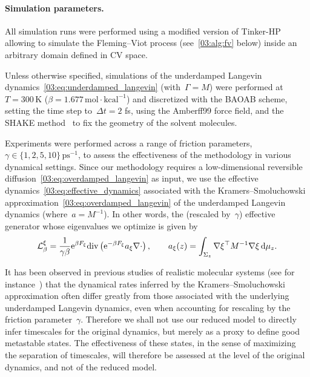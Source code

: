 \paragraph{Simulation parameters.}
All simulation runs were performed using a modified version of Tinker-HP~\cite{Tinker18} allowing to simulate the Fleming--Viot process (see~\ref{03:alg:fv} below) inside an arbitrary domain defined in CV space.

Unless otherwise specified, simulations of the underdamped Langevin dynamics~\eqref{03:eq:underdamped_langevin} (with~$\Gamma=M$) were performed at~$T=300\,\mathrm{K}$ ($\beta=1.677\,\mathrm{mol}\cdot\mathrm{kcal}^{-1}$) and discretized with the BAOAB scheme, setting the time step to~$\Delta t = 2$ fs, using the Amberff99 force field, and the SHAKE method~\cite{RCB77} to fix the geometry of the solvent molecules.

Experiments were performed across a range of friction parameters,~$\gamma\in\{1,2,5,10\}\,\mathrm{ps}^{-1}$, to assess the effectiveness of the methodology in various dynamical settings.
Since our methodology requires a low-dimensional reversible diffusion~\eqref{03:eq:overdamped_langevin} as input, we use the effective dynamics~\eqref{03:eq:effective_dynamics} associated with the Kramers--Smoluchowski approximation~\eqref{03:eq:overdamped_langevin} of the underdamped Langevin dynamics (where~$a=M^{-1}$). In other words, the (rescaled by~$\gamma$) effective generator whose eigenvalues we optimize is given by
\begin{equation}
    \label{03:eq:eff_generator_num}
    \mathcal{L}_\beta^\xi=\frac1{\gamma\beta}\mathrm{e}^{\beta F_\xi}\mathrm{div}\left(\mathrm{e}^{-\beta F_\xi}a_\xi\nabla\cdot\right),\qquad a_{\xi}(z) = \int_{\Sigma_z}\nabla\xi^\top M^{-1}\nabla\xi\,\mathrm{d}\mu_z.
\end{equation}

It has been observed in previous studies of realistic molecular systems (see for instance~\cite[Sections 4.2.2 and 4.3.2]{NN24}) that the dynamical rates inferred by the Kramers--Smoluchowski approximation often differ greatly from those associated with the underlying underdamped Langevin dynamics, even when accounting for rescaling by the friction parameter~$\gamma$. Therefore we shall not use our reduced model to directly infer timescales for the original dynamics, but merely as a proxy to define good metastable states.
The effectiveness of these states, in the sense of maximizing the separation of timescales, will therefore be assessed at the level of the original dynamics, and not of the reduced model.

